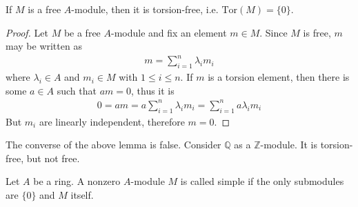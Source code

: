 \begin{thmbox}
    \begin{lemma}
        If \(M\) is a free \(A\)-module, then it is torsion-free, i.e. \(\mathrm{Tor}(M) = \{0\}\).
    \end{lemma}
\end{thmbox}
\begin{proof}
    Let \(M\) be a free \(A\)-module and fix an element \(m \in M\). Since \(M\) is free, \(m\) may be written as
    \begin{align*}
        m = \sum_{i = 1}^n \lambda_i m_i
    \end{align*}
    where \(\lambda_i \in A\) and \(m_i \in M\) with \(1 \leq i \leq n\). If \(m\) is a torsion element, then there is some \(a \in A\) such that \(am = 0\), thus it is
    \begin{align*}
        0 = am = a \sum_{i = 1}^n \lambda_i m_i = \sum_{i = 1}^n a \lambda_i m_i
    \end{align*}
    But \(m_i\) are linearly independent, therefore \(m = 0\).
\end{proof}

\begin{exmbox}
    \begin{example}
        The converse of the above lemma is false. Consider \(\mathbb{Q}\) as a \(\mathbb{Z}\)-module. It is torsion-free, but not free.
    \end{example}
\end{exmbox}

\begin{defbox}
    \begin{definition}[Annihilator]
        
    \end{definition}
\end{defbox}

\begin{defbox}
    \begin{definition}[Radical]
        
    \end{definition}
\end{defbox}

\begin{defbox}
    \begin{definition}
        Let \(A\) be a ring. A nonzero \(A\)-module \(M\) is called simple if the only submodules are \(\{0\}\) and \(M\) itself.
    \end{definition}
\end{defbox}

